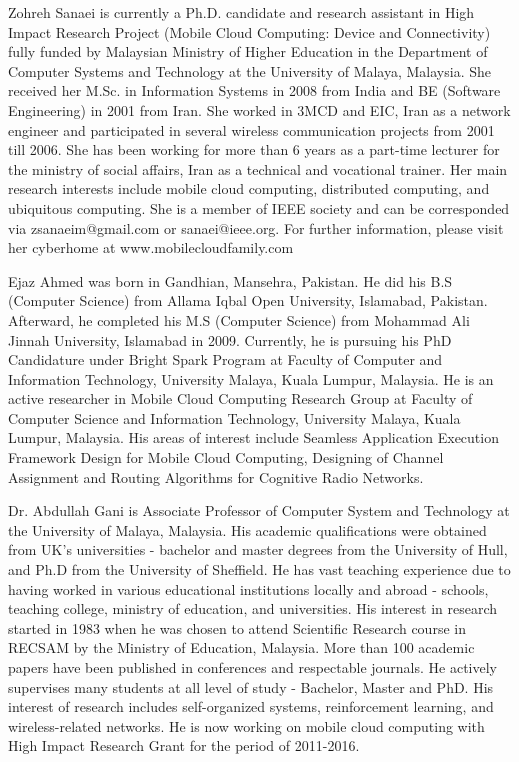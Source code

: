 \documentclass[publish]{IEEEtran}
\begin{document}
\begin{biography}{Zohreh Sanaei} is currently a Ph.D. candidate and research assistant in High Impact Research Project (Mobile Cloud Computing: Device and Connectivity) fully funded by Malaysian Ministry of Higher Education in the Department of Computer Systems and Technology at the University of Malaya, Malaysia. She received her M.Sc. in Information Systems in 2008 from India and BE (Software Engineering) in 2001 from Iran. She worked in 3MCD and EIC, Iran as a network engineer and participated in several wireless communication projects from 2001 till 2006. She has been working for more than 6 years as a part-time lecturer for the ministry of social affairs, Iran as a technical and vocational trainer. Her main research interests include mobile cloud computing, distributed computing, and ubiquitous computing. She is a member of IEEE society and can be corresponded via zsanaeim@gmail.com or sanaei@ieee.org. For further information, please visit her cyberhome at www.mobilecloudfamily.com
\end{biography}

\begin{biography}{Ejaz Ahmed} was 
born in Gandhian, Mansehra, Pakistan. He did his B.S (Computer Science) from Allama Iqbal Open University, Islamabad, Pakistan. Afterward, he completed his M.S (Computer Science) from Mohammad Ali Jinnah University, Islamabad in 2009. Currently, he is pursuing his PhD Candidature under Bright Spark Program at Faculty of Computer and Information Technology, University Malaya, Kuala Lumpur, Malaysia. He is an active researcher in Mobile Cloud Computing Research Group at Faculty of Computer Science and Information Technology, University Malaya, Kuala Lumpur, Malaysia. His areas of interest include Seamless Application Execution Framework Design for Mobile Cloud Computing, Designing of Channel Assignment and Routing Algorithms for Cognitive Radio Networks.
\end{biography}


\vspace*{-1.5\baselineskip}
\begin{biography}{Dr. Abdullah Gani} is Associate Professor of Computer System and Technology at the University of Malaya, Malaysia. His academic qualifications were obtained from UK's universities - bachelor and master degrees from the University of Hull, and Ph.D from the University of Sheffield. He has vast teaching experience due to having worked in various educational institutions locally and abroad - schools, teaching college, ministry of education, and universities. His interest in research started in 1983 when he was chosen to attend Scientific Research course in RECSAM by the Ministry of Education, Malaysia. More than 100 academic papers have been published in conferences and respectable journals. He actively supervises many students at all level of study - Bachelor, Master and PhD. His interest of research includes self-organized systems, reinforcement learning, and wireless-related networks. He is now working on mobile cloud computing with High Impact Research Grant for the period of 2011-2016.
\end{biography}
\end{document}
